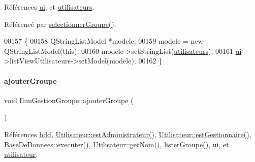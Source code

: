 Références \hyperlink{class_ihm_gestion_groupe_a9785ad3dadc1d2cad8558ca8b682dffd}{ui}, et \hyperlink{class_ihm_gestion_groupe_a1f14e24cf672c5d0b6ae86084f758846}{utilisateurs}.



Référencé par \hyperlink{class_ihm_gestion_groupe_a322f2c8584ae8e5be7f2075b73905beb}{selectionner\+Groupe()}.


\begin{DoxyCode}
00157 \{
00158     QStringListModel *modele;
00159     modele = \textcolor{keyword}{new} QStringListModel(\textcolor{keyword}{this});
00160     modele->setStringList(\hyperlink{class_ihm_gestion_groupe_a1f14e24cf672c5d0b6ae86084f758846}{utilisateurs});
00161     \hyperlink{class_ihm_gestion_groupe_a9785ad3dadc1d2cad8558ca8b682dffd}{ui}->listViewUtilisateurs->setModel(modele);
00162 \}
\end{DoxyCode}
\mbox{\label{class_ihm_gestion_groupe_a5e5b11cb395970f64b30427ccb2ecf4d}} 
\paragraph{\texorpdfstring{ajouter\+Groupe}{ajouterGroupe}}
{\footnotesize\ttfamily void Ihm\+Gestion\+Groupe\+::ajouter\+Groupe (\begin{DoxyParamCaption}{ }\end{DoxyParamCaption})\hspace{0.3cm}{\ttfamily [slot]}}



Références \hyperlink{class_ihm_gestion_groupe_a4f0049a7046abe7530d7f7eaed7ed2bc}{bdd}, \hyperlink{class_utilisateur_a2c4ede0ec936ebd64d73df1e1dde3a5d}{Utilisateur\+::est\+Administrateur()}, \hyperlink{class_utilisateur_a3c86ddd77b243fd3f12ad2e85ff06759}{Utilisateur\+::est\+Gestionnaire()}, \hyperlink{class_base_de_donnees_aa8de5f8f8bb17edc43f5c0ee33712081}{Base\+De\+Donnees\+::executer()}, \hyperlink{class_utilisateur_adfffec2519ba338497de55b61e7bc420}{Utilisateur\+::get\+Nom()}, \hyperlink{class_ihm_gestion_groupe_a7afabe81c405b35e7cfd4e760eda8c84}{lister\+Groupe()}, \hyperlink{class_ihm_gestion_groupe_a9785ad3dadc1d2cad8558ca8b682dffd}{ui}, et \hyperlink{class_ihm_gestion_groupe_a87b9d242561e8bf7765aa14a5e124db1}{utilisateur}.



